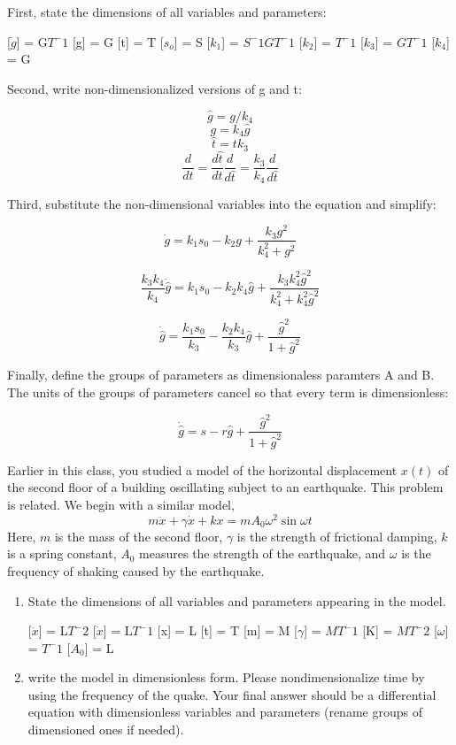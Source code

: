 \documentclass[11pt,answers]{exam}
\begin{document}
\begin{questions}
\begin{solution}
First, state the dimensions of all variables and parameters:

[$\dot{g}$] = G$T^-1$
[g] = G
[t] = T
[$s_{o}$] = S
[$k_{1}$] = $S^-1GT^-1$
[$k_{2}$] = $T^-1$
[$k_{3}$] = $GT^-1$
[$k_{4}$] = G

Second, write non-dimensionalized versions of g and t:

$$\hat{g} = g/k_{4}$$
$$g = k_{4}\hat{g}$$
$$\hat{t}= tk_{3}$$
$$\frac{d}{dt} = \frac{d\hat{t}}{dt}\frac{d}{d\hat{t}} = \frac{k_{3}}{k_{4}}\frac{d}{d\hat{t}}$$

Third, substitute the non-dimensional variables into the equation and simplify:

$$\dot{g} = k_1s_0 - k_2g + \frac{k_3g^2}{k_4^2 + g^2}$$

$$\frac{k_3k_4}{k_4}\dot{\hat{g}} = k_1s_0 - k_2k_4\hat{g} + \frac{k_3k_4^2\hat{g}^2}{k_4^2 + k_4^2\hat{g}^2}$$

$$\dot{\hat{g}} = \frac{k_1s_0}{k_3} - \frac{k_2k_4}{k_3}\hat{g} + \frac{\hat{g}^2}{1 + \hat{g}^2}$$

Finally, define the groups of parameters as dimensionaless paramters A and B. The units of the groups of parameters cancel so that every term is dimensionless:

$$\dot{\hat{g}} = s - r\hat{g} + \frac{\hat{g}^2}{1 + \hat{g}^2}$$

\end{solution}

\item Earlier in this class, you studied a model of the horizontal displacement $x(t)$ of the second floor of a building oscillating subject to an earthquake. This problem is related. We begin with a similar model,
\[
m\ddot{x} + \gamma\dot{x} + kx = mA_0\omega^2\sin{\omega t}
\]
Here, $m$ is the mass of the second floor, $\gamma$ is the strength of frictional damping, $k$ is a spring constant, $A_0$ measures the strength of the earthquake, and $\omega$ is the frequency of shaking caused by the earthquake.
\begin{enumerate}
\item State the dimensions of all variables and parameters appearing in the model.

\begin{solution}

[$\ddot{x}$] = L$T^-2$
[$\dot{x}$] = L$T^-1$
[x] = L
[t] = T
[m] = M
[$\gamma$] = $MT^-1$
[K] = $MT^-2$
[$\omega$] = $T^-1$
[$A_0$] = L
\end{solution}

\item write the model in dimensionless form.  Please nondimensionalize time by using the frequency of the quake.  Your final answer should be a differential equation with dimensionless variables and parameters (rename groups of dimensioned ones if needed).


\end{enumerate}
\end{questions}
\end{document}
